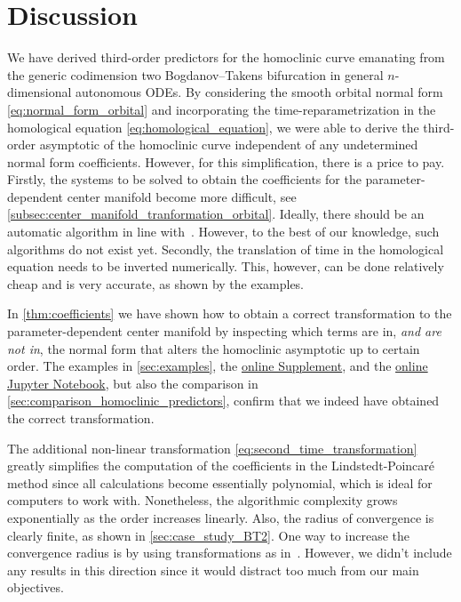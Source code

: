 \section{Discussion}%
We have derived third-order predictors for the homoclinic curve emanating from
the generic codimension two Bogdanov--Takens bifurcation in general
$n$-dimensional autonomous ODEs. By considering the smooth orbital normal form
\cref{eq:normal_form_orbital} and incorporating the time-re\-pa\-ram\-e\-triza\-tion in the
homological equation \cref{eq:homological_equation}, we were able to derive
the third-order asymptotic of the homoclinic curve independent of any undetermined
normal form coefficients. However, for this simplification, there is a price to
pay. Firstly, the systems to be solved to obtain the coefficients for the
parameter-dependent center manifold become more difficult, see
\cref{subsec:center_manifold_tranformation_orbital}. Ideally, there should be
an automatic algorithm in line with~\cite{Murdock@2003}. However, to the best
of our knowledge, such algorithms do not exist yet.  Secondly, the translation
of time in the homological equation needs to be inverted numerically. This,
however, can be done relatively cheap and is very accurate, as shown by the
examples.

In \cref{thm:coefficients} we have shown how to obtain a correct transformation
to the parameter-dependent center manifold by inspecting which terms are in,
\emph{and are not in}, the normal form that alters the homoclinic asymptotic up
to certain order. The examples in \cref{sec:examples}, the
\hyperref[mysupplement]{online Supplement}, and the
\href{https://mmbosschaert.github.io/MatCont7p2NewInitBTHom-/}{online Jupyter
Notebook}, but also the comparison in
\cref{sec:comparison_homoclinic_predictors}, confirm that we indeed have
obtained the correct transformation.

The additional non-linear transformation
\cref{eq:second_time_transformation} greatly simplifies the computation
of the coefficients in the Lindstedt-Poincar\'e method since all calculations
become essentially polynomial, which is ideal for computers to work with.
Nonetheless, the algorithmic complexity grows exponentially as the order
increases linearly. Also, the radius of convergence is clearly finite, as shown
in \cref{sec:case_study_BT2}. One way to increase the convergence radius is by
using transformations as in~\cite{Milton@1974}. However, we didn't include any
results in this direction since it would distract too much from our main
objectives.


